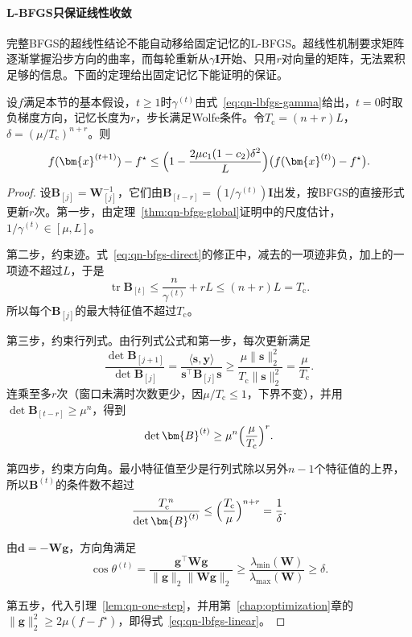 \paragraph{L-BFGS只保证线性收敛}
完整BFGS的超线性结论不能自动移给固定记忆的L-BFGS。超线性机制要求矩阵逐渐掌握沿步方向的曲率，而每轮重新从$\gamma\bm{I}$开始、只用$r$对向量的矩阵，无法累积足够的信息。下面的定理给出固定记忆下能证明的保证。

\begin{theorem}[L-BFGS的线性收敛]
\label{thm:qn-lbfgs-linear}
设$f$满足本节的基本假设，$t\geq1$时$\gamma^{(t)}$由式~\eqref{eq:qn-lbfgs-gamma}给出，$t=0$时取负梯度方向，记忆长度为$r$，步长满足Wolfe条件。令$T_{\mathrm{c}}=(n+r)L$，$\delta=(\mu/T_{\mathrm{c}})^{n+r}$。则
\begin{equation}
 f(\bm{x}^{(t+1)})-f^\star\leq\Bigl(1-\frac{2\mu c_1(1-c_2)\delta^2}{L}\Bigr)\bigl(f(\bm{x}^{(t)})-f^\star\bigr).
 \label{eq:qn-lbfgs-linear}
\end{equation}
\end{theorem}

\begin{proof}
设$\bm{B}_{[j]}=\bm{W}_{[j]}^{-1}$，它们由$\bm{B}_{[t-r]}=(1/\gamma^{(t)})\bm{I}$出发，按BFGS的直接形式更新$r$次。第一步，由定理~\ref{thm:qn-bfgs-global}证明中的尺度估计，$1/\gamma^{(t)}\in[\mu,L]$。

第二步，约束迹。式~\eqref{eq:qn-bfgs-direct}的修正中，减去的一项迹非负，加上的一项迹不超过$L$，于是
\[
 \operatorname{tr}\bm{B}_{[t]}\leq\frac{n}{\gamma^{(t)}}+rL\leq(n+r)L=T_{\mathrm{c}}.
\]
所以每个$\bm{B}_{[j]}$的最大特征值不超过$T_{\mathrm{c}}$。

第三步，约束行列式。由行列式公式和第一步，每次更新满足
\[
 \frac{\det\bm{B}_{[j+1]}}{\det\bm{B}_{[j]}}=\frac{\langle\bm{s},\bm{y}\rangle}{\bm{s}^\top\bm{B}_{[j]}\bm{s}}\geq\frac{\mu\lVert\bm{s}\rVert_2^2}{T_{\mathrm{c}}\lVert\bm{s}\rVert_2^2}=\frac{\mu}{T_{\mathrm{c}}}.
\]
连乘至多$r$次（窗口未满时次数更少，因$\mu/T_{\mathrm{c}}\leq1$，下界不变），并用$\det\bm{B}_{[t-r]}\geq\mu^n$，得到
\[
 \det\bm{B}^{(t)}\geq\mu^n\Bigl(\frac{\mu}{T_{\mathrm{c}}}\Bigr)^r.
\]

第四步，约束方向角。最小特征值至少是行列式除以另外$n-1$个特征值的上界，所以$\bm{B}^{(t)}$的条件数不超过
\[
 \frac{T_{\mathrm{c}}^{\,n}}{\det\bm{B}^{(t)}}\leq\Bigl(\frac{T_{\mathrm{c}}}{\mu}\Bigr)^{n+r}=\frac{1}{\delta}.
\]

由$\bm{d}=-\bm{W}\bm{g}$，方向角满足
\[
 \cos\theta^{(t)}=\frac{\bm{g}^\top\bm{W}\bm{g}}{\lVert\bm{g}\rVert_2\lVert\bm{W}\bm{g}\rVert_2}\geq\frac{\lambda_{\min}(\bm{W})}{\lambda_{\max}(\bm{W})}\geq\delta.
\]

第五步，代入引理~\ref{lem:qn-one-step}，并用第~\ref{chap:optimization}章的$\lVert\bm{g}\rVert_2^2\geq2\mu(f-f^\star)$，即得式~\eqref{eq:qn-lbfgs-linear}。
\end{proof}

